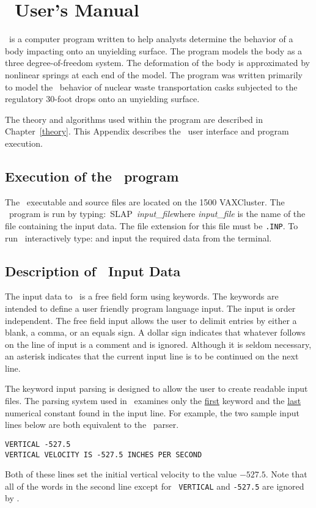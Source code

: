 \chapter{\SLAP\ User's Manual}

\SLAP\  is a computer program written to help analysts determine the
behavior of a body impacting onto an unyielding surface.  The program
models the body as a three degree-of-freedom system.  The deformation of
the body is approximated by nonlinear springs at each end of the model.
The program was written primarily to model the \SLAP\  behavior of
nuclear waste transportation casks subjected to the regulatory 30-foot
drops onto an unyielding surface. 

The theory and algorithms used within the program are described in
Chapter~\ref{theory}.  This Appendix describes the \SLAP\ user interface
and program execution. 

\section{Execution of the \SLAP\  program}

The \SLAP\ executable and source files are located on the 1500
VAXCluster. The \SLAP\ program is run by typing:\hbox{\ {\sf SLAP
}{\em input\_file}}\quad where {\em input\_file} is the name of the
file containing the input data.  The file extension for this file must
be {\tt .INP}. To run \SLAP\ interactively type:\quad
and input the required data from the terminal. 

\section{Description of \SLAP\  Input Data}

The input data to \SLAP\ is a free field form using keywords.  The
keywords are intended to define a user friendly program language input.
The input is order independent.  The free field input allows the user to
delimit entries by either a blank, a comma, or an equals sign.  A dollar
sign indicates that whatever follows on the line of input is a comment
and is ignored.  Although it is seldom necessary, an asterisk indicates
that the current input line is to be continued on the next line. 

The keyword input parsing is designed to allow the user to create
readable input files.  The parsing system used in \SLAP\ examines only
the \underline{first} keyword and the \underline{last} numerical
constant found in the input line.  For example, the two sample input
lines below are both equivalent to the \SLAP\ parser. 
\begin{verbatim}
VERTICAL -527.5
VERTICAL VELOCITY IS -527.5 INCHES PER SECOND
\end{verbatim}
Both of these lines set the initial vertical velocity to the value
$-527.5$.  Note that all of the words in the second line except for {\tt
VERTICAL} and {\tt -527.5} are ignored by \SLAP. 

